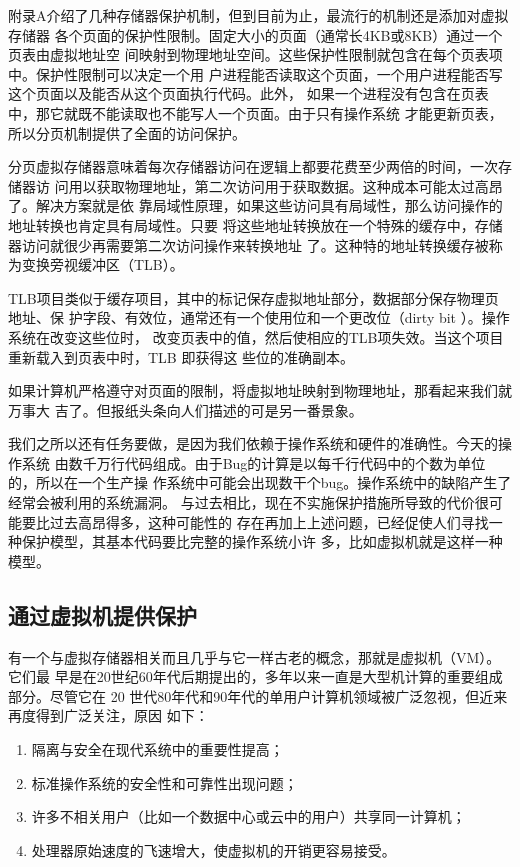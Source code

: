 附录A介绍了几种存储器保护机制，但到目前为止，最流行的机制还是添加对虚拟存储器
各个页面的保护性限制。固定大小的页面（通常长4KB或8KB）通过一个页表由虚拟地址空
间映射到物理地址空间。这些保护性限制就包含在每个页表项中。保护性限制可以决定一个用
户进程能否读取这个页面，一个用户进程能否写这个页面以及能否从这个页面执行代码。此外，
如果一个进程没有包含在页表中，那它就既不能读取也不能写人一个页面。由于只有操作系统
才能更新页表，所以分页机制提供了全面的访问保护。

分页虚拟存储器意味着每次存储器访问在逻辑上都要花费至少两倍的时间，一次存储器访
问用以获取物理地址，第二次访问用于获取数据。这种成本可能太过高昂了。解决方案就是依
靠局域性原理，如果这些访问具有局域性，那么访问操作的地址转换也肯定具有局域性。只要
将这些地址转换放在一个特殊的缓存中，存储器访问就很少再需要第二次访问操作来转换地址
了。这种特的地址转换缓存被称为变换旁视缓冲区（TLB）。

TLB项目类似于缓存项目，其中的标记保存虚拟地址部分，数据部分保存物理页地址、保
护字段、有效位，通常还有一个使用位和一个更改位（dirty bit ）。操作系统在改变这些位时，
改变页表中的值，然后使相应的TLB项失效。当这个项目重新载入到页表中时，TLB 即获得这
些位的准确副本。

如果计算机严格遵守对页面的限制，将虚拟地址映射到物理地址，那看起来我们就万事大
吉了。但报纸头条向人们描述的可是另一番景象。

我们之所以还有任务要做，是因为我们依赖于操作系统和硬件的准确性。今天的操作系统
由数千万行代码组成。由于Bug的计算是以每千行代码中的个数为单位的，所以在一个生产操
作系统中可能会出现数干个bug。操作系统中的缺陷产生了经常会被利用的系统漏洞。
与过去相比，现在不实施保护措施所导致的代价很可能要比过去高昂得多，这种可能性的
存在再加上上述问题，已经促使人们寻找一种保护模型，其基本代码要比完整的操作系统小许
多，比如虚拟机就是这样一种模型。

\subsection{通过虚拟机提供保护}
有一个与虚拟存储器相关而且几乎与它一样古老的概念，那就是虚拟机（VM）。它们最
早是在20世纪60年代后期提出的，多年以来一直是大型机计算的重要组成部分。尽管它在
20 世代80年代和90年代的单用户计算机领域被广泛忽视，但近来再度得到广泛关注，原因
如下：

\begin{enumerate}
    \item 隔离与安全在现代系统中的重要性提高；
    \item 标准操作系统的安全性和可靠性出现问题；
    \item 许多不相关用户（比如一个数据中心或云中的用户）共享同一计算机；
    \item 处理器原始速度的飞速增大，使虚拟机的开销更容易接受。
\end{enumerate}

